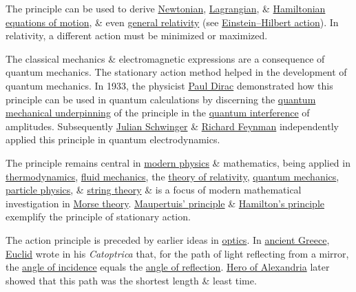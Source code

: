 \documentclass{article}
\begin{document}
The principle can be used to derive \href{https://en.wikipedia.org/wiki/Newtonian_mechanics}{Newtonian}, \href{https://en.wikipedia.org/wiki/Lagrangian_mechanics}{Lagrangian}, \& \href{https://en.wikipedia.org/wiki/Hamiltonian_mechanics}{Hamiltonian} \href{https://en.wikipedia.org/wiki/Equations_of_motion}{equations of motion}, \& even \href{https://en.wikipedia.org/wiki/General_relativity}{general relativity} (see \href{https://en.wikipedia.org/wiki/Einstein%E2%80%93Hilbert_action}{Einstein--Hilbert action}). In relativity, a different action must be minimized or maximized.

The classical mechanics \& electromagnetic expressions are a consequence of quantum mechanics. The stationary action method helped in the development of quantum mechanics. In 1933, the physicist \href{https://en.wikipedia.org/wiki/Paul_Dirac}{Paul Dirac} demonstrated how this principle can be used in quantum calculations by discerning the \href{https://en.wikipedia.org/wiki/Path_integral_formulation#Quantum_action_principle}{quantum mechanical underpinning} of the principle in the \href{https://en.wikipedia.org/wiki/Interference_(wave_propagation)#Quantum_interference}{quantum interference} of amplitudes. Subsequently \href{https://en.wikipedia.org/wiki/Julian_Schwinger}{Julian Schwinger} \& \href{https://en.wikipedia.org/wiki/Richard_Feynman}{Richard Feynman} independently applied this principle in quantum electrodynamics.

The principle remains central in \href{https://en.wikipedia.org/wiki/Modern_physics}{modern physics} \& mathematics, being applied in \href{https://en.wikipedia.org/wiki/Thermodynamics}{thermodynamics}, \href{https://en.wikipedia.org/wiki/Fluid_mechanics}{fluid mechanics}, the \href{https://en.wikipedia.org/wiki/Theory_of_relativity}{theory of relativity}, \href{https://en.wikipedia.org/wiki/Quantum_mechanics}{quantum mechanics}, \href{https://en.wikipedia.org/wiki/Particle_physics}{particle physics}, \& \href{https://en.wikipedia.org/wiki/String_theory}{string theory} \& is a focus of modern mathematical investigation in \href{https://en.wikipedia.org/wiki/Morse_theory}{Morse theory}. \href{https://en.wikipedia.org/wiki/Maupertuis%27_principle}{Maupertuis' principle} \& \href{https://en.wikipedia.org/wiki/Hamilton%27s_principle}{Hamilton's principle} exemplify the principle of stationary action.

The action principle is preceded by earlier ideas in \href{https://en.wikipedia.org/wiki/Optics}{optics}. In \href{https://en.wikipedia.org/wiki/Ancient_Greece}{ancient Greece}, \href{https://en.wikipedia.org/wiki/Euclid}{Euclid} wrote in his \textit{Catoptrica} that, for the path of light reflecting from a mirror, the \href{https://en.wikipedia.org/wiki/Angle_of_incidence_(optics)}{angle of incidence} equals the \href{https://en.wikipedia.org/wiki/Angle_of_reflection}{angle of reflection}. \href{https://en.wikipedia.org/wiki/Hero_of_Alexandria}{Hero of Alexandria} later showed that this path was the shortest length \& least time.
\end{document}
